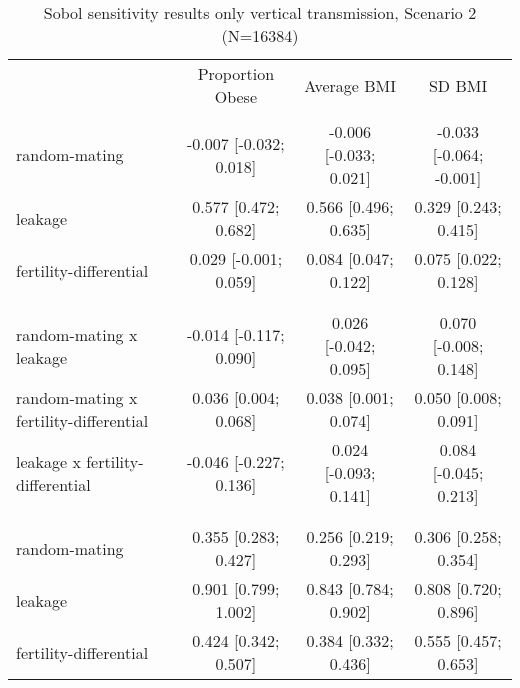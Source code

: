 
\begin{table}[htp]
\renewcommand{\arraystretch}{1.3}
\setlength{\tabcolsep}{5pt}
\caption{Sobol sensitivity results only vertical transmission, Scenario 2 (N=16384)}
\label{tab:sobol-vt}
\footnotesize
\centering
\begin{threeparttable}
\begin{tabular}{lccc}
\hline
\addlinespace
& Proportion Obese & Average BMI & SD BMI \\
\addlinespace
\hline
\addlinespace[6pt]
\multicolumn{4}{l}{\hspace{1em} S1} \\
\hspace{1.5em} random-mating & -0.007 [-0.032; 0.018]   & -0.006 [-0.033; 0.021]   & -0.033 [-0.064; -0.001] \\
	  \hspace{1.5em} leakage & 0.577 [0.472; 0.682]   & 0.566 [0.496; 0.635]   & 0.329 [0.243; 0.415] \\
	  \hspace{1.5em} fertility-differential & 0.029 [-0.001; 0.059]   & 0.084 [0.047; 0.122]   & 0.075 [0.022; 0.128] \\
	 \\
\addlinespace[12pt]
\multicolumn{4}{l}{\hspace{1em} S2} \\ 
\hspace{1.5em} random-mating x leakage & -0.014 [-0.117; 0.090]   & 0.026 [-0.042; 0.095]   & 0.070 [-0.008; 0.148] \\
	  \hspace{1.5em} random-mating x fertility-differential & 0.036 [0.004; 0.068]   & 0.038 [0.001; 0.074]   & 0.050 [0.008; 0.091] \\
	  \hspace{1.5em} leakage x fertility-differential & -0.046 [-0.227; 0.136]   & 0.024 [-0.093; 0.141]   & 0.084 [-0.045; 0.213] \\
	 \\
\addlinespace[12pt]
\multicolumn{4}{l}{\hspace{1em} ST} \\ 
\hspace{1.5em} random-mating & 0.355 [0.283; 0.427]   & 0.256 [0.219; 0.293]   & 0.306 [0.258; 0.354] \\
	  \hspace{1.5em} leakage & 0.901 [0.799; 1.002]   & 0.843 [0.784; 0.902]   & 0.808 [0.720; 0.896] \\
	  \hspace{1.5em} fertility-differential & 0.424 [0.342; 0.507]   & 0.384 [0.332; 0.436]   & 0.555 [0.457; 0.653] \\

\end{tabular}
\end{threeparttable}
\end{table}
